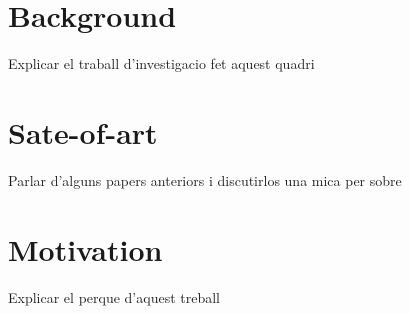 \section{Background}

Explicar el traball d'investigacio fet aquest quadri

\section{Sate-of-art}

Parlar d'alguns papers anteriors i discutirlos una mica per sobre

\section{Motivation}

Explicar el perque d'aquest treball